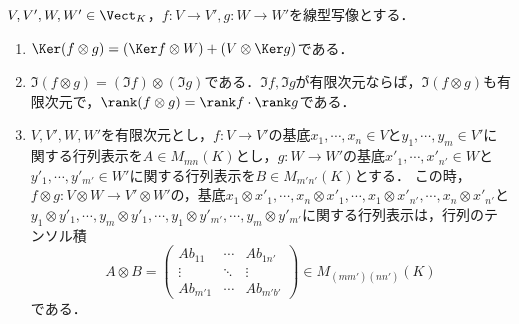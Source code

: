 \documentclass[uplatex, dvipdfmx]{jsreport}
\begin{document}
\begin{proposition}[行列のテンソル積]\label{prop-tensor-product-of-matrices}
    $V,V',W,W'\in\Vect_K$，$f:V\to V',g:W\to W'$を線型写像とする．
    \begin{enumerate}
        \item $\Ker(f\otimes g)=(\Ker f\otimes W)+(V\otimes\Ker g)$である．
        \item $\Im(f\otimes g)=(\Im f)\otimes(\Im g)$である．$\Im f,\Im g$が有限次元ならば，$\Im(f\otimes g)$も有限次元で，$\rank(f\otimes g)=\rank f\cdot\rank g$である．
        \item $V,V',W,W'$を有限次元とし，$f:V\to V'$の基底$x_1,\cdots,x_n\in V$と$y_1,\cdots,y_m\in V'$に関する行列表示を$A\in M_{mn}(K)$とし，$g:W\to W'$の基底$x'_1,\cdots,x'_{n'}\in W$と$y'_1,\cdots,y'_{m'}\in W'$に関する行列表示を$B\in M_{m'n'}(K)$とする．
        この時，$f\otimes g:V\otimes W\to V'\otimes W'$の，基底$x_1\otimes x'_1,\cdots,x_n\otimes x'_1,\cdots,x_1\otimes x'_{n'},\cdots,x_n\otimes x'_{n'}$と$y_1\otimes y'_1,\cdots,y_m\otimes y'_1,\cdots,y_1\otimes y'_{m'},\cdots,y_m\otimes y'_{m'}$に関する行列表示は，行列のテンソル積
        \[A\otimes B=\begin{pmatrix}Ab_{11}&\cdots&Ab_{1n'}\\\vdots&\ddots&\vdots\\Ab_{m'1}&\cdots&Ab_{m'b'}\end{pmatrix}\in M_{(mm')(nn')}(K)\]
        である．
    \end{enumerate}
\end{proposition}
\end{document}
